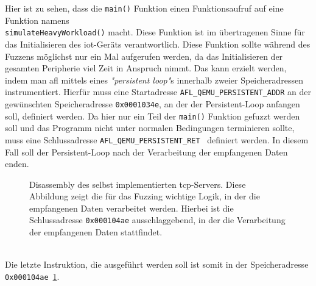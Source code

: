 Hier ist zu sehen, dass die \texttt{main()} Funktion einen Funktionsaufruf auf eine Funktion namens \\ \texttt{simulateHeavyWorkload()}
macht.
Diese Funktion ist im übertragenen Sinne für das Initialisieren des \gls{iot}-Geräts verantwortlich.
Diese Funktion sollte während des Fuzzens möglichst nur ein Mal aufgerufen werden, da das Initialisieren der gesamten Peripherie
viel Zeit in Anspruch nimmt.
Das kann erzielt werden, indem man \gls{afl} mittels eines \textit{"persistent loop"}s innerhalb zweier Speicheradressen
instrumentiert.
Hierfür muss eine Startadresse \texttt{AFL\_QEMU\_PERSISTENT\_ADDR} an der gewünschten Speicheradresse \texttt{0x0001034e},
an der der Persistent-Loop anfangen soll, definiert werden.
Da hier nur ein Teil der \texttt{main()} Funktion gefuzzt werden soll und das Programm nicht unter normalen Bedingungen terminieren
sollte, muss eine Schlussadresse \texttt{AFL\_QEMU\_PERSISTENT\_RET}~\cite{qemu-persistent} definiert werden.
In diesem Fall soll der Persistent-Loop nach der Verarbeitung der empfangenen Daten enden. \\
\begin{figure}[h]
    \caption{Disassembly des selbst implementierten \gls{tcp}-Servers. Diese Abbildung zeigt die für das Fuzzing wichtige
    Logik, in der die empfangenen Daten verarbeitet werden.
    Hierbei ist die Schlussadresse \texttt{0x000104ae} ausschlaggebend, in der die Verarbeitung der empfangenen
    Daten stattfindet.}\label{fig:example-server-disassembly-return}
\end{figure}\\
Die letzte Instruktion, die ausgeführt werden soll ist somit in der Speicheradresse \texttt{0x000104ae}~\ref{fig:example-server-disassembly-return}.
